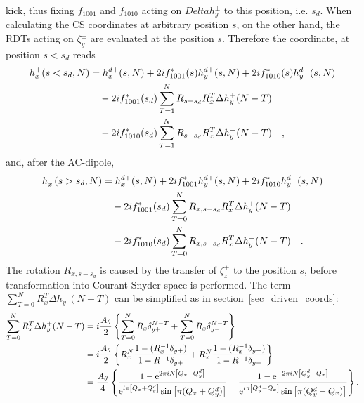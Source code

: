 kick, thus fixing $f_{1001}$ and $f_{1010}$ acting on $Delta h_y^\pm$ to this position, i.e. $s_d$.
When calculating the CS coordinates at arbitrary position $s$, on the other hand, the RDTs acting on
$\zeta_y^\pm$ are evaluated at the position $s$. Therefore the coordinate, at position $s<s_d$ reads
%
\begin{align}
    h_x^+(s<s_d, N) &= h_x^{d+}(s,N)
        + 2if_{1001}^*(s) h_y^{d+} (s, N)
        + 2if_{1010}^*(s) h_y^{d-} (s, N) \notag \\
        & \quad - 2if_{1001}^*(s_d) \sum\limits_{T = 1}^N R_{s-s_d}R_x^{T}\Delta h_y^+(N-T) \notag \\
        & \quad - 2if_{1010}^*(s_d) \sum\limits_{T = 1}^N R_{s-s_d}R_x^{T}\Delta h_y^-(N-T)
        \quad ,
        \notag \\
\end{align}
%
and, after the AC-dipole,
%
\begin{align}
    h_x^+(s>s_d, N) &= h_x^{d+}(s,N)
        + 2if_{1001}^* h_y^{d+} (s, N)
        + 2if_{1010}^* h_y^{d-} (s, N) \notag \\
        & \quad - 2if_{1001}^*(s_d) \sum\limits_{T = 0}^N R_{x,s-s_d}R_x^{T}\Delta h_y^+(N-T) \notag \\
        & \quad - 2if_{1010}^*(s_d) \sum\limits_{T = 0}^N R_{x,s-s_d}R_x^{T}\Delta h_y^-(N-T)
        \quad .
\end{align}
%
The rotation $R_{x,s-s_d}$ is caused by the transfer of $\zeta_z^\pm$ to the position $s$,
before transformation into Courant-Snyder space is performed. 
The term $\sum\limits_{T = 0}^N R_x^{T}\Delta h_y^+(N-T) $ can be simplified as in section~\ref{sec_driven_coords}:
%
\begin{align}
    \sum\limits_{T=0}^N R_x^T \Delta h_y^+(N-T)
        &=
        i\frac{A_\theta}{2} \left\{
            \sum\limits_{T=0}^N R_x \delta_{y+}^{N-T}
            +\sum\limits_{T=0}^N R_x \delta_{y-}^{N-T}
        \right\}
        \notag \\
        &=
        i\frac{A_\theta}{2} \left\{
            R_x^N\frac{1-(R_x^{-1}\delta_{y+})}{1-R^{-1}\delta_{y+}}
            +R_x^N\frac{1-(R_x^{-1}\delta_{y-})}{1-R^{-1}\delta_{y-}}
        \right\}
        \notag \\
        &=
        \frac{A_\theta}{4} \left\{
            \frac{1-\text{e}^{2\pi i N\left[ Q_x + Q_y^d \right]}}{\text{e}^{i\pi \left[Q_x+Q_y^d\right]}\sin\left[\pi (Q_x+Q_y^d)\right]}
            -\frac{1-\text{e}^{-2\pi i N\left[ Q_y^d - Q_x \right]}}{\text{e}^{i\pi \left[Q_y^d-Q_x\right] }\sin\left[\pi (Q_y^d-Q_x)\right]}
        \right\}
        .
\end{align}
